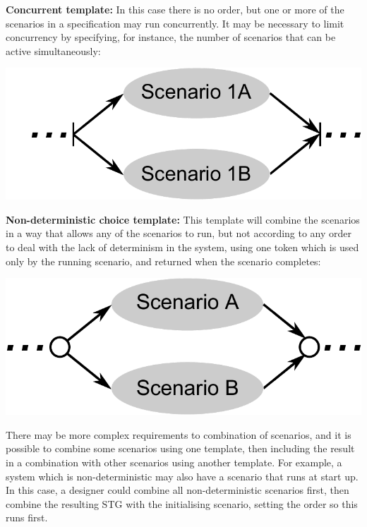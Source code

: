 \documentclass[british, journal]{IEEEtran}
\begin{document}
\textbf{Concurrent template:} In this case there is no order, but one or more
of the scenarios in a specification may run concurrently. It may be necessary
to limit concurrency by specifying, for instance, the number of scenarios
that can be active simultaneously:

\vspace{-2mm}
\begin{center}
\includegraphics[scale=0.42]{Images/concurrent_combination}
\end{center}

\textbf{Non-deterministic choice template:} This template will combine the
scenarios in a way that allows any of the scenarios to run, but not
according to any order to deal with the lack of determinism in the
system, using one token which is used only by the running scenario,
and returned when the scenario completes:

\vspace{2mm}
\begin{center}
\includegraphics[scale=0.42]{Images/non_deterministic_combination}
\end{center}

There may be more complex requirements to combination of scenarios, and it
is possible to combine some scenarios using one template, then including
the result in a combination with other scenarios using another template.
For example, a system which is non-deterministic may also have a scenario
that runs at start up. In this case, a designer could combine all
non-deterministic scenarios first, then combine the resulting STG with
the initialising scenario, setting the order so this runs first.
\end{document}
